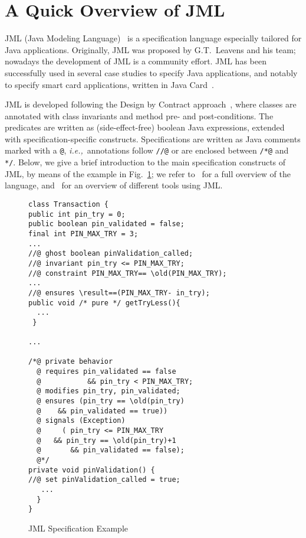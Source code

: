 \section{A Quick Overview of JML}\label{sect-JML}

JML (Java Modeling
Language)~\cite{Leavens-etal03,Preliminary} is a specification
language especially tailored for Java applications. Originally, JML
was proposed by G.T.~Lea\-vens and his team; nowadays the development of
JML is a community effort. JML has been successfully used in several
case studies to specify Java applications, and notably to specify
smart card applications, written in Java
Card~\cite{BreunesseCHJ03,BousquetLMOL04,JacobsMR04}.

JML is developed following the Design by Contract
approach~\cite{Meyer97}, where classes are annotated with class
invariants and method pre- and post-conditions. The
predicates are written as (side-effect-free) boolean Java expressions,
extended with specification-specific constructs. Specifications
are written as Java comments marked with a \texttt{@},
\emph{i.e.,}\/~annotations follow \texttt{//@} or are enclosed between \texttt{/*@} and
\texttt{*/}. Below, we give a brief introduction to the main
specification constructs of JML, by means of the example in
Fig.~\ref{SpecJavacard}; we refer
to~\cite{Leavens-etal03} for a full overview of the language,
and~\cite{Burdy-etal03} for an overview of different tools using JML.



\begin{figure}[t]
\begin{scriptsize}
\begin{multicols}{2}
\begin{verbatim}
class Transaction {
public int pin_try = 0;
public boolean pin_validated = false;
final int PIN_MAX_TRY = 3;
...
//@ ghost boolean pinValidation_called;
//@ invariant pin_try <= PIN_MAX_TRY;
//@ constraint PIN_MAX_TRY== \old(PIN_MAX_TRY);
...
//@ ensures \result==(PIN_MAX_TRY- in_try);
public void /* pure */ getTryLess(){
  ...
 }

...

/*@ private behavior
  @ requires pin_validated == false
  @           && pin_try < PIN_MAX_TRY;
  @ modifies pin_try, pin_validated;
  @ ensures (pin_try == \old(pin_try)
  @    && pin_validated == true))
  @ signals (Exception) 
  @     ( pin_try <= PIN_MAX_TRY
  @	  && pin_try == \old(pin_try)+1
  @       && pin_validated == false);
  @*/
private void pinValidation() {
//@ set pinValidation_called = true;
   ...
  }
}
\end{verbatim}
\end{multicols}
\end{scriptsize}
\caption{JML Specification Example}
\label{SpecJavacard}
\end{figure}

